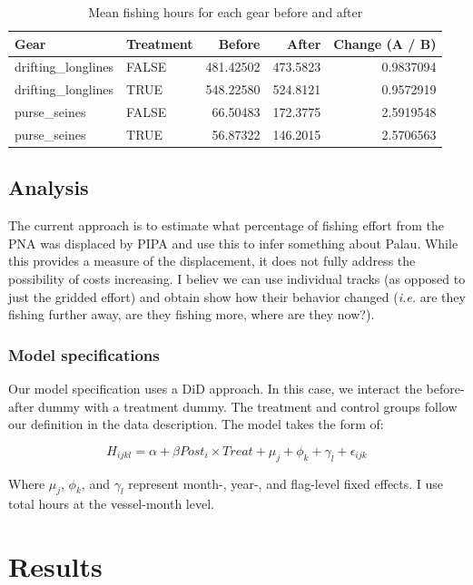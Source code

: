 \documentclass[]{article}
\begin{document}
\begin{table}[H]

\caption{\label{tab:unnamed-chunk-6}\label{tab:baci_h}Mean fishing hours for each gear before and after}
\centering
\begin{tabular}[t]{llrrr}
\toprule
Gear & Treatment & Before & After & Change (A / B)\\
\midrule
drifting\_longlines & FALSE & 481.42502 & 473.5823 & 0.9837094\\
drifting\_longlines & TRUE & 548.22580 & 524.8121 & 0.9572919\\
purse\_seines & FALSE & 66.50483 & 172.3775 & 2.5919548\\
purse\_seines & TRUE & 56.87322 & 146.2015 & 2.5706563\\
\bottomrule
\end{tabular}
\end{table}

\subsection{Analysis}\label{analysis}

The current approach is to estimate what percentage of fishing effort
from the PNA was displaced by PIPA and use this to infer something about
Palau. While this provides a measure of the displacement, it does not
fully address the possibility of costs increasing. I believ we can use
individual tracks (as opposed to just the gridded effort) and obtain
show how their behavior changed (\emph{i.e.} are they fishing further
away, are they fishing more, where are they now?).

\subsubsection{Model specifications}\label{model-specifications}

Our model specification uses a DiD approach. In this case, we interact
the before-after dummy with a treatment dummy. The treatment and control
groups follow our definition in the data description. The model takes
the form of:

\[
H_{ijkl} = \alpha + \beta Post_i \times Treat + \mu_j + \phi_k + \gamma_l+ \epsilon_{ijk}
\]

Where \(\mu_j\), \(\phi_k\), and \(\gamma_l\) represent month-, year-,
and flag-level fixed effects. I use total hours at the vessel-month
level.

\section{Results}\label{results}
\end{document}
